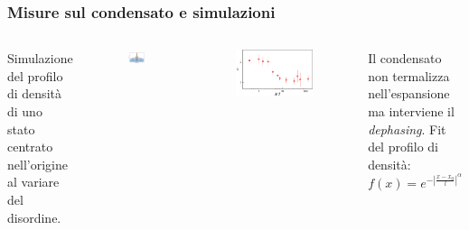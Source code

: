 \documentclass[10pt, t]{beamer}
\begin{document}
\begin{frame}

\frametitle{Misure sul condensato e simulazioni}

\begin{columns}


\begin{center}
Simulazione del profilo di densità di uno stato centrato nell'origine al variare del disordine. 
\end{center}

\begin{center}
\begin{figure}
\includegraphics[scale=0.25]{immaginiPresentazione/simulation.png}
\end{figure}
\end{center}



\begin{figure}
\includegraphics[scale=0.20]{immaginiPresentazione/fit1.png}
\end{figure}

\begin{center}
Il condensato non termalizza nell'espansione ma interviene il \emph{dephasing}.
Fit del profilo di densità:\\
\vspace{10pt}
$f(x) = e^{- \left| \frac{x-x_0}{l} \right| ^ {\alpha}}$
\end{center}


\end{columns}
\end{frame}
\end{document}
